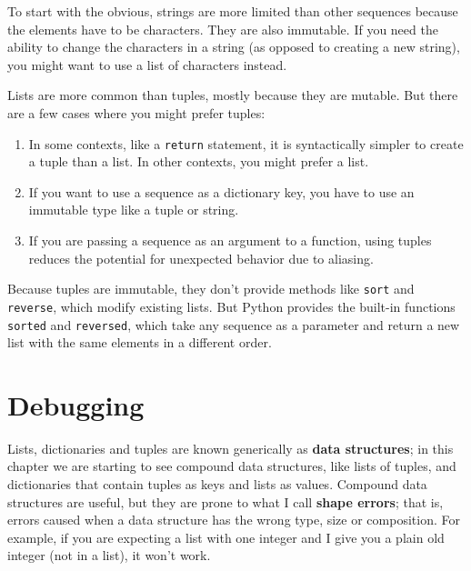 \documentclass[10pt]{book}
\begin{document}

To start with the obvious, strings are more limited than other
sequences because the elements have to be characters.  They are
also immutable.  If you need the ability to change the characters
in a string (as opposed to creating a new string), you might
want to use a list of characters instead.

Lists are more common than tuples, mostly because they are mutable.
But there are a few cases where you might prefer tuples:

\begin{enumerate}

\item In some contexts, like a {\tt return} statement, it is
syntactically simpler to create a tuple than a list.  In other
contexts, you might prefer a list.

\item If you want to use a sequence as a dictionary key, you
have to use an immutable type like a tuple or string.

\item If you are passing a sequence as an argument to a function,
using tuples reduces the potential for unexpected behavior
due to aliasing.

\end{enumerate}

Because tuples are immutable, they don't provide methods
like {\tt sort} and {\tt reverse}, which modify existing lists.
But Python provides the built-in functions {\tt sorted}
and {\tt reversed}, which take any sequence as a parameter
and return a new list with the same elements in a different
order.



\section{Debugging}


Lists, dictionaries and tuples are known generically as {\bf data
  structures}; in this chapter we are starting to see compound data
structures, like lists of tuples, and dictionaries that contain tuples
as keys and lists as values.  Compound data structures are useful, but
they are prone to what I call {\bf shape errors}; that is, errors
caused when a data structure has the wrong type, size or composition.
For example, if you are expecting a list with one integer and I
give you a plain old integer (not in a list), it won't work.
\end{document}
